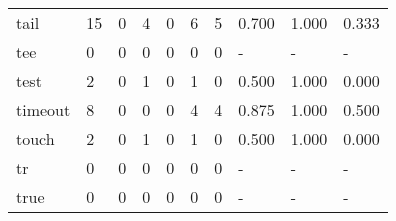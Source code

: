 \begin{longtable}{lp{2.0cm}p{2.0cm}p{2.0cm}p{2.0cm}p{2.0cm}p{2.0cm}p{2.0cm}p{2.0cm}p{2.0cm}}
tail      &                     15 &                                  0 &                                 4 &                                0 &                                 6 &                               5 &                                0.700 &                                  1.000 &                                0.333 \\
tee       &                      0 &                                  0 &                                 0 &                                0 &                                 0 &                               0 &                                    - &                                      - &                                    - \\
test      &                      2 &                                  0 &                                 1 &                                0 &                                 1 &                               0 &                                0.500 &                                  1.000 &                                0.000 \\
timeout   &                      8 &                                  0 &                                 0 &                                0 &                                 4 &                               4 &                                0.875 &                                  1.000 &                                0.500 \\
touch     &                      2 &                                  0 &                                 1 &                                0 &                                 1 &                               0 &                                0.500 &                                  1.000 &                                0.000 \\
tr        &                      0 &                                  0 &                                 0 &                                0 &                                 0 &                               0 &                                    - &                                      - &                                    - \\
true      &                      0 &                                  0 &                                 0 &                                0 &                                 0 &                               0 &                                    - &                                      - &                                    - \\

\end{longtable}
